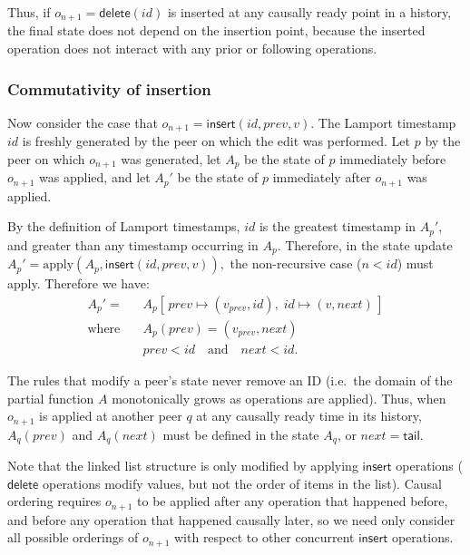 \documentclass[10pt,journal,compsoc]{IEEEtran}
\begin{document}
Thus, if $o_{n+1}=\mathsf{delete}(\mathit{id})$ is inserted at any causally ready point in a history, the final state does not depend on the insertion point, because the inserted operation does not interact with any prior or following operations.

\subsubsection{Commutativity of insertion}

Now consider the case that $o_{n+1}=\mathsf{insert}(\mathit{id}, \mathit{prev}, v)$. The Lamport timestamp $\mathit{id}$ is freshly generated by the peer on which the edit was performed. Let $p$ by the peer on which $o_{n+1}$ was generated, let $A_p$ be the state of $p$ immediately before $o_{n+1}$ was applied, and let $A_p'$ be the state of $p$ immediately after $o_{n+1}$ was applied.

By the definition of Lamport timestamps, $\mathit{id}$ is the greatest timestamp in $A_p'$, and greater than any timestamp occurring in $A_p$. Therefore, in the state update $A_p' = \mathrm{apply}(A_p, \mathsf{insert}(\mathit{id}, \mathit{prev}, v)),$ the non-recursive case ($n < \mathit{id}$) must apply. Therefore we have:
\begin{align*}
A_p' =\; & A_p[\,\mathit{prev} \mapsto (v_\mathit{prev}, \mathit{id}),\; \mathit{id} \mapsto (v, \mathit{next})\,] \\
\text{where}\quad & A_p(\mathit{prev}) = (v_\mathit{prev}, \mathit{next}) \\
& \mathit{prev} < \mathit{id} \quad\text{and}\quad \mathit{next} < \mathit{id}.
\end{align*}

The rules that modify a peer's state never remove an ID (i.e.\ the domain of the partial function $A$ monotonically grows as operations are applied). Thus, when $o_{n+1}$ is applied at another peer $q$ at any causally ready time in its history, $A_q(\mathit{prev})$ and $A_q(\mathit{next})$ must be defined in the state $A_q$, or $\mathit{next} = \mathsf{tail}$.

Note that the linked list structure is only modified by applying $\mathsf{insert}$ operations ($\mathsf{delete}$ operations modify values, but not the order of items in the list). Causal ordering requires $o_{n+1}$ to be applied after any operation that happened before, and before any operation that happened causally later, so we need only consider all possible orderings of $o_{n+1}$ with respect to other concurrent $\mathsf{insert}$ operations.
\end{document}
